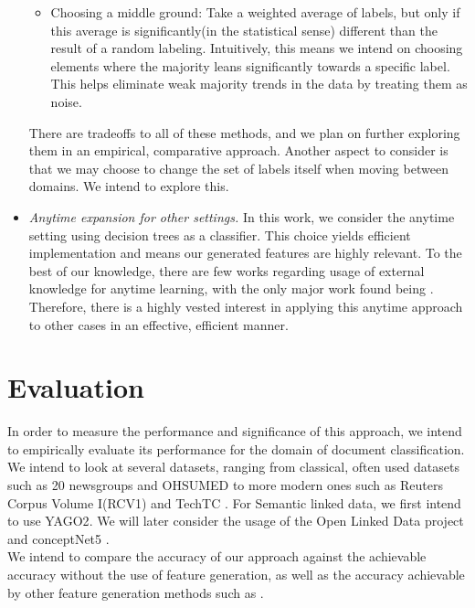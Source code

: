 \documentclass[12pt, a4paper]{article}
\theoremstyle{definition}
\begin{document}
\begin{itemize}
\begin{itemize}
            \item Choosing a middle ground: Take a weighted average of labels, but only if this average is significantly(in the statistical sense) different than the result of a random labeling. Intuitively, this means we intend on choosing elements where the majority leans significantly towards a specific label. This helps eliminate weak majority trends in the data by treating them as noise.
        \end{itemize}
        There are tradeoffs to all of these methods, and we plan on further exploring them in an empirical, comparative approach.
        Another aspect to consider is that we may choose to change the set of labels itself when moving between domains. We intend to explore this.
    \item \emph{Anytime expansion for other settings.} In this work, we consider the anytime setting using decision trees as a classifier. This choice yields efficient implementation and means our generated features are highly relevant. To the best of our knowledge, there are few works regarding usage of external knowledge for anytime learning, with the only major work found being \citet{lindgren2000anytime}. Therefore, there is a highly vested interest in applying this anytime approach to other cases in an effective, efficient manner.
\end{itemize}

\section{Evaluation}
In order to measure the performance and significance of this approach, we intend to empirically evaluate its performance for the domain of document classification. We intend to look at several datasets, ranging from classical, often used datasets such as 20 newsgroups \citep{Lang95} and OHSUMED \citep{hersh1994ohsumed} to more modern ones such as Reuters Corpus Volume I(RCV1)\citep{lewis2004rcv1} and TechTC \citep{davidov2004parameterized}. For Semantic linked data, we first intend to use YAGO2\citep{hoffart2013yago2}. We will later consider the usage of the Open Linked Data project\citep{bizer2009linked} and conceptNet5 \citep{speer2012representing}.\\

We intend to compare the accuracy of our approach against the achievable accuracy without the use of feature generation, as well as the accuracy achievable by other feature generation methods such as \citet{gabrilovich2006overcoming}.
\end{document}
